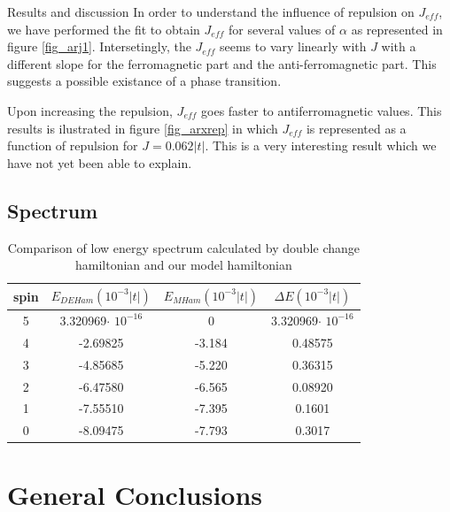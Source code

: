 \documentclass[12pt,twoside]{report}
\begin{document}
\begin{chapter}{Results and discussion}
	In order to understand the influence of repulsion on $J_{eff}$, we have
	performed the fit to obtain $J_{eff}$ for several values of $\alpha$ as
	represented in figure \ref{fig_arj1}. Intersetingly, the $J_{eff}$ seems to
	vary linearly with $J$ with a different slope for the ferromagnetic part and
	the anti-ferromagnetic part. This suggests a possible existance of a phase
	transition.

	Upon increasing the repulsion, $J_{eff}$ goes faster to antiferromagnetic
	values. This results is ilustrated in figure \ref{fig_arxrep} in which
	$J_{eff}$ is represented as a function of repulsion for $J=0.062|t|$. This
	is a very interesting result which we have not yet been able to explain.
   \section{Spectrum}
   \begin{table}[H]
	\caption{Comparison of low energy spectrum calculated by double change hamiltonian and our model hamiltonian }
	\begin{center}
		\begin{tabular}{|c|c|c|c|}
			\hline
			 spin & $E_{DEHam}(10^{-3}|t|)$ & $E_{MHam}(10^{-3}|t|)$ & $\Delta E(10^{-3}|t|)$ \\
			\hline
			5 & 3.320969$\cdot$ $10^{-16}$ & 0  & 3.320969$\cdot$ $10^{-16}$ \\
			\hline
			4 & -2.69825 & -3.184 & 0.48575 \\
			\hline
			3 & -4.85685 & -5.220 & 0.36315 \\
			\hline
			2 & -6.47580 & -6.565 & 0.08920 \\
			\hline
			1 & -7.55510 & -7.395 & 0.1601 \\
			\hline
			0 & -8.09475 & -7.793 & 0.3017  \\
			\hline
		\end{tabular}
	\end{center}
\end{table}

	\end{chapter} %
	
	\chapter*{ General Conclusions}
	\newpage
	\renewcommand{\bibname}{References}
		\setcounter{page}{2}
\end{document}
